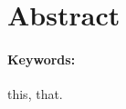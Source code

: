 \documentclass[a4paper,oneside,10pt]{article}
\begin{document}
\setlength{\headheight}{50pt}



\thispagestyle{titlepage} 
\pagestyle{fancy}
\fancyhf{}
\renewcommand{\headrulewidth}{0.0pt}
\renewcommand{\footrulewidth}{0.0pt}
\fancyfoot[C]{\thepage}

\section*{Abstract}
\begin{singlespace}
\textit{\blindtext}
\end{singlespace}

\paragraph*{Keywords:} this, that.


 
% 
% 
% 
%
%
%
% 

%

\printbibliography
\end{document}
